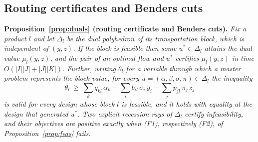 \subsection{Routing certificates and Benders cuts}\label{app:duals}

\noindent
\textbf{Proposition~\ref{prop:duals} (routing certificate and Benders cuts).}
\emph{Fix a product $l$ and let $\Delta_l$ be the dual polyhedron of its
transportation block, which is independent of $(y,z)$. If the block is
feasible then some $u^\ast\in\Delta_l$ attains the dual value
$\mu_l(y,z)$, and the pair of an optimal flow and $u^\ast$ certifies
$\mu_l(y,z)$ in time $O(|I||J|+|J||K|)$. Further, writing $\theta_l$ for
a variable through which a master problem represents the block value, for
every $u=(\alpha,\beta,\sigma,\pi)\in\Delta_l$ the inequality
\[
\theta_l\ \ge\ \sum_k q_{kl}\,\alpha_k
      -\sum_i b_{il}\,\sigma_i\,y_i-\sum_j p_{jl}\,\pi_j\,z_j
\]
is valid for every design whose block $l$ is feasible, and it holds with
equality at the design that generated $u^\ast$. Two explicit recession
rays of $\Delta_l$ certify infeasibility, and their objectives are
positive exactly when (F1), respectively (F2), of
Proposition~\ref{prop:feas} fails.}

